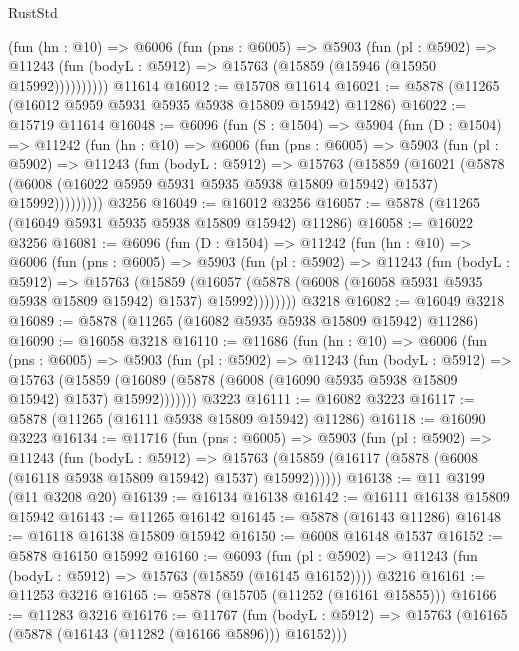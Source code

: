 \begin{lexlean}{RustStd}
\begin{coremodule}
          (fun (hn : @10) =>
          @6006
            (fun (pns : @6005) =>
            @5903
              (fun (pl : @5902) =>
              @11243 (fun (bodyL : @5912) => @15763 (@15859 (@15946 (@15950 @15992))))))))))
    @11614
@16012 := @15708 @11614
@16021 := @5878 (@11265 (@16012 @5959 @5931 @5935 @5938 @15809 @15942) @11286)
@16022 := @15719 @11614
@16048 := @6096
    (fun (S : @1504) =>
    @5904
      (fun (D : @1504) =>
      @11242
        (fun (hn : @10) =>
        @6006
          (fun (pns : @6005) =>
          @5903
            (fun (pl : @5902) =>
            @11243
              (fun (bodyL : @5912) =>
              @15763
                (@15859
                  (@16021
                    (@5878
                      (@6008 (@16022 @5959 @5931 @5935 @5938 @15809 @15942) @1537)
                      @15992)))))))))
    @3256
@16049 := @16012 @3256
@16057 := @5878 (@11265 (@16049 @5931 @5935 @5938 @15809 @15942) @11286)
@16058 := @16022 @3256
@16081 := @6096
    (fun (D : @1504) =>
    @11242
      (fun (hn : @10) =>
      @6006
        (fun (pns : @6005) =>
        @5903
          (fun (pl : @5902) =>
          @11243
            (fun (bodyL : @5912) =>
            @15763
              (@15859
                (@16057 (@5878 (@6008 (@16058 @5931 @5935 @5938 @15809 @15942) @1537) @15992))))))))
    @3218
@16082 := @16049 @3218
@16089 := @5878 (@11265 (@16082 @5935 @5938 @15809 @15942) @11286)
@16090 := @16058 @3218
@16110 := @11686
    (fun (hn : @10) =>
    @6006
      (fun (pns : @6005) =>
      @5903
        (fun (pl : @5902) =>
        @11243
          (fun (bodyL : @5912) =>
          @15763
            (@15859 (@16089 (@5878 (@6008 (@16090 @5935 @5938 @15809 @15942) @1537) @15992)))))))
    @3223
@16111 := @16082 @3223
@16117 := @5878 (@11265 (@16111 @5938 @15809 @15942) @11286)
@16118 := @16090 @3223
@16134 := @11716
    (fun (pns : @6005) =>
    @5903
      (fun (pl : @5902) =>
      @11243
        (fun (bodyL : @5912) =>
        @15763 (@15859 (@16117 (@5878 (@6008 (@16118 @5938 @15809 @15942) @1537) @15992))))))
@16138 := @11 @3199 (@11 @3208 @20)
@16139 := @16134 @16138
@16142 := @16111 @16138 @15809 @15942
@16143 := @11265 @16142
@16145 := @5878 (@16143 @11286)
@16148 := @16118 @16138 @15809 @15942
@16150 := @6008 @16148 @1537
@16152 := @5878 @16150 @15992
@16160 := @6093
    (fun (pl : @5902) => @11243 (fun (bodyL : @5912) => @15763 (@15859 (@16145 @16152))))
    @3216
@16161 := @11253 @3216
@16165 := @5878 (@15705 (@11252 (@16161 @15855)))
@16166 := @11283 @3216
@16176 := @11767
    (fun (bodyL : @5912) => @15763 (@16165 (@5878 (@16143 (@11282 (@16166 @5896))) @16152)))

\end{coremodule}
\end{lexlean}
